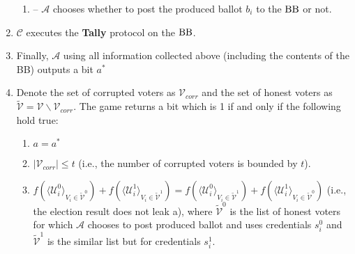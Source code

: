 \begin{definition}
\begin{enumerate}
\begin{enumerate}
\item[] -- $\mathcal{A}$ chooses whether to post the produced ballot $b_i$ to the $\operatorname{BB}$ or not. 
\end{enumerate}
\item $\mathcal{C}$ executes the \textbf{Tally} protocol on the $\operatorname{BB}$. 
\item Finally, $\mathcal{A}$ using all information collected above (including the contents of the BB) outputs a bit $a^*$
\item Denote the set of corrupted voters as $\mathcal{V}_{corr}$ and the set of honest voters as $\tilde{\mathcal{V}}= \mathcal{V} \backslash \mathcal{V}_{corr}$. The game returns a bit which is 1 if and only if the following hold true:
\begin{enumerate}
 \item $a = a^*$
 \item $|\mathcal{V}_{corr}| \leq t$ (i.e., the number of corrupted voters is bounded by $t$).
 \item $f(\langle \mathcal{U}^0_i \rangle _{V_i \in \tilde{\mathcal{V}}^0} ) + f(\langle \mathcal{U}^1_i \rangle _{V_i \in \tilde{\mathcal{V}}^1} ) =  f(\langle \mathcal{U}^0_i \rangle _{V_i \in \tilde{\mathcal{V}}^1} ) +  f(\langle \mathcal{U}^1_i \rangle _{V_i \in \tilde{\mathcal{V}}^0} )$ (i.e., the election result does not leak a), where  $ \tilde{\mathcal{V}}^0$ is the list of honest voters for which $\mathcal{A}$ chooses to post produced ballot and uses credentials $s_i^0$  and $ \tilde{\mathcal{V}}^1$ is the similar list but for credentials $s_i^1$. 
  \end{enumerate} 
\end{enumerate}
\end{definition}

